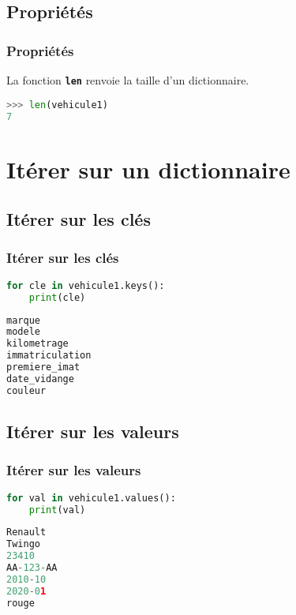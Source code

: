 \documentclass[svgnames,11pt]{beamer}
\begin{document}
\subsection{Propriétés}
\begin{frame}[fragile]
    \frametitle{Propriétés}
\begin{aretenir}[]
La fonction \textbf{\texttt{len}} renvoie la taille d'un dictionnaire.
\end{aretenir}
\begin{lstlisting}[language=Python , basicstyle=\ttfamily\small, xleftmargin=2em, xrightmargin=2em]
>>> len(vehicule1)
7
\end{lstlisting}

\end{frame}
\section{Itérer sur un dictionnaire}
\subsection{Itérer sur les clés}
\begin{frame}[fragile]
    \frametitle{Itérer sur les clés}

\begin{lstlisting}[language=Python , basicstyle=\ttfamily\small, xleftmargin=2em, xrightmargin=2em]
for cle in vehicule1.keys():
    print(cle)
\end{lstlisting}

\begin{lstlisting}[language=Python , basicstyle=\ttfamily\small, xleftmargin=2em, xrightmargin=2em]
marque
modele
kilometrage
immatriculation
premiere_imat
date_vidange
couleur
\end{lstlisting}
\end{frame}
\subsection{Itérer sur les valeurs}
\begin{frame}[fragile]
    \frametitle{Itérer sur les valeurs}

\begin{lstlisting}[language=Python , basicstyle=\ttfamily\small, xleftmargin=2em, xrightmargin=2em]
for val in vehicule1.values():
    print(val)
\end{lstlisting}

\begin{lstlisting}[language=Python , basicstyle=\ttfamily\small, xleftmargin=2em, xrightmargin=2em]
Renault
Twingo
23410
AA-123-AA
2010-10
2020-01
rouge
\end{lstlisting}
\end{frame}
\end{document}
